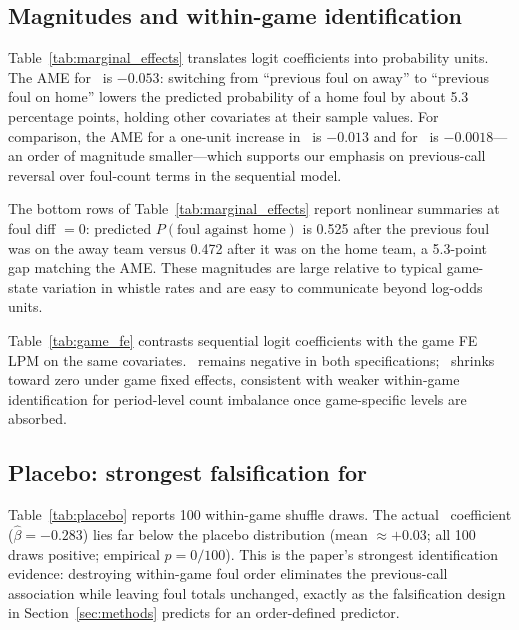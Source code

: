 \subsection{Magnitudes and within-game identification}
\label{sec:results:margins}

Table~\ref{tab:marginal_effects} translates logit coefficients into probability units. The AME for \foullast\ is $-0.053$: switching from ``previous foul on away'' to ``previous foul on home'' lowers the predicted probability of a home foul by about 5.3 percentage points, holding other covariates at their sample values. For comparison, the AME for a one-unit increase in \perioddiff\ is $-0.013$ and for \fouldiff\ is $-0.0018$---an order of magnitude smaller---which supports our emphasis on previous-call reversal over foul-count terms in the sequential model.

The bottom rows of Table~\ref{tab:marginal_effects} report nonlinear summaries at foul diff $=0$: predicted $P(\text{foul against home})$ is 0.525 after the previous foul was on the away team versus 0.472 after it was on the home team, a 5.3-point gap matching the AME. These magnitudes are large relative to typical game-state variation in whistle rates and are easy to communicate beyond log-odds units.



Table~\ref{tab:game_fe} contrasts sequential logit coefficients with the game FE LPM on the same covariates. \foullast\ remains negative in both specifications; \perioddiff\ shrinks toward zero under game fixed effects, consistent with weaker within-game identification for period-level count imbalance once game-specific levels are absorbed.



\subsection{Placebo: strongest falsification for \foullast}
\label{sec:results:placebo}

Table~\ref{tab:placebo} reports 100 within-game shuffle draws. The actual \foullast\ coefficient ($\hat{\beta}=-0.283$) lies far below the placebo distribution (mean $\approx +0.03$; all 100 draws positive; empirical $p=0/100$). This is the paper's strongest identification evidence: destroying within-game foul order eliminates the previous-call association while leaving foul totals unchanged, exactly as the falsification design in Section~\ref{sec:methods} predicts for an order-defined predictor.

